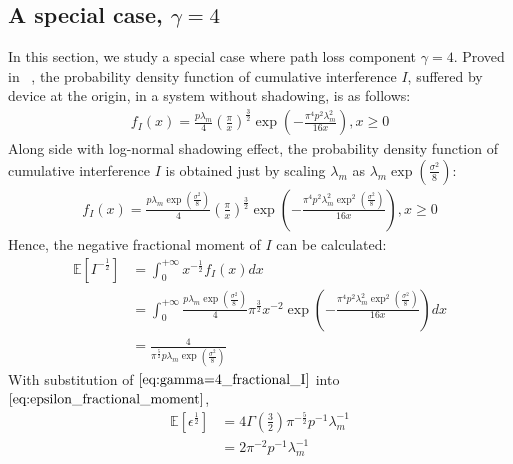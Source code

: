 
\subsection{A special case, $\gamma=4$}
In this section, we study a special case where path loss component $\gamma=4$. Proved in ~\cite[Eq. 3.17]{haenggi2009interference}, the probability density function of cumulative interference $I$, suffered by device at the origin, in a system without shadowing, is as follows:
\begin{align}
f_{I}(x) = \frac{p\lambda_{m}}{4} (\frac{\pi}{x})^{\frac{3}{2}} \exp(-\frac{\pi^4 p^2\lambda_{m}^2}{16x}), x \geq 0
\end{align}
Along side with log-normal shadowing effect, the probability density function of cumulative interference $I$ is obtained just by scaling $\lambda_{m}$ as $ \lambda_{m} \exp(\frac{\sigma^2}{8})$:
\begin{align}
f_{I}(x) = \frac{    p\lambda_{m}   \exp(\frac{\sigma^2}{8})  }{4} (\frac{\pi}{x})^{\frac{3}{2}} \exp(    -\frac{    \pi^4    p^2\lambda_{m}^2     \exp^2(\frac{\sigma^2}{8})    }{    16x    }    ), x \geq 0
\end{align} 
Hence, the negative fractional moment of $I$ can be calculated:
\begin{align}
\label{eq:gamma=4_fractional_I}
\mathbb{E}\left[ I ^{-\frac{1}{2}}\right] &= \int_{0}^{+\infty} x^{-\frac{1}{2}} f_{I}(x) dx \nonumber\\
&= \int_{0}^{+\infty}  \frac{    p\lambda_{m}   \exp(\frac{\sigma^2}{8})  }{4}   \pi^{\frac{3}{2}}  x^{-2}  \exp(    -\frac{    \pi^4    p^2\lambda_{m}^2     \exp^2(\frac{\sigma^2}{8})    }{    16x    }    )  dx \nonumber\\
&= \frac{4}{    \pi^{\frac{5}{2}}  p\lambda_{m} \exp(\frac{\sigma^2}{8}) }
\end{align}
With substitution of $\eqref{eq:gamma=4_fractional_I}$ into $\eqref{eq:epsilon_fractional_moment}$,
\begin{align}
\label{eq:negative_fractonal_epsilon_4}
\mathbb{E}\left[ \epsilon ^{\frac{1}{2}} \right] & = 4\Gamma(\frac{3}{2})\pi^{-\frac{5}{2}} p^{-1}\lambda_{m}^{-1}\nonumber\\
&=2\pi^{-2} p^{-1}\lambda_{m}^{-1}
\end{align}
